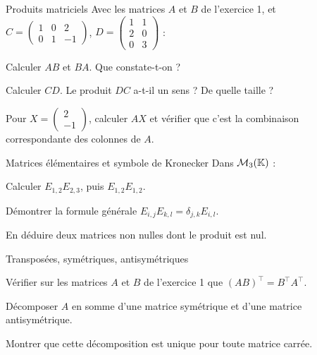 \begin{exercice}[1]{Produits matriciels}
Avec les matrices $A$ et $B$ de l'exercice 1, et
$C=\begin{pmatrix}1&0&2\\0&1&-1\end{pmatrix}$,
$D=\begin{pmatrix}1&1\\2&0\\0&3\end{pmatrix}$ :
\begin{questions}
  \item Calculer $AB$ et $BA$. Que constate-t-on ?
  \item Calculer $CD$. Le produit $DC$ a-t-il un sens ? De quelle taille ?
  \item Pour $X=\begin{pmatrix}2\\-1\end{pmatrix}$, calculer $AX$ et
    vérifier que c'est la combinaison correspondante des colonnes de $A$.
\end{questions}
\end{exercice}

\begin{exercice}[1]{Matrices élémentaires et symbole de Kronecker}
Dans $\mathcal{M}_3(\mathbb{K})$ :
\begin{questions}
  \item Calculer $E_{1,2}E_{2,3}$, puis $E_{1,2}E_{1,2}$.
  \item Démontrer la formule générale
    $E_{i,j}E_{k,l}=\delta_{j,k}E_{i,l}$.
  \item En déduire deux matrices non nulles dont le produit est nul.
\end{questions}
\end{exercice}

\begin{exercice}[1]{Transposées, symétriques, antisymétriques}
\begin{questions}
  \item Vérifier sur les matrices $A$ et $B$ de l'exercice 1 que
    $(AB)^{\top}=B^{\top}A^{\top}$.
  \item Décomposer $A$ en somme d'une matrice symétrique et d'une matrice
    antisymétrique.
  \item Montrer que cette décomposition est unique pour toute matrice
    carrée.
\end{questions}
\end{exercice}

